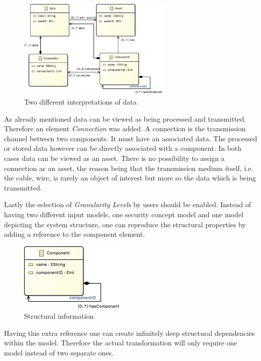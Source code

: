 \begin{figure}[H]
\centering
\includegraphics[width=0.65\textwidth]{pictures/two_data.png}
\caption{Two different interpretations of data}
\label{fig:data}
\end{figure} 

As already mentioned data can be viewed as being processed and transmitted. Therefore an element \textit{Connection} was added. A connection is the transmission channel between two components. It must have an associated data. The processed or stored data however can be directly associated with a component. In both cases data can be viewed as an asset. There is no possibility to assign a connection as an asset, the reason being that the transmission medium itself, i.e. the cable, wire, is rarely an object of interest but more so the data which is being transmitted.

Lastly the selection of \textit{Granularity Levels} by users should be enabled. Instead of having two different input models, one security concept model and one model depicting the system structure, one can reproduce the structural properties by adding a reference to the component element.      

\begin{figure}[H]
\centering
\includegraphics[width=0.45\textwidth]{pictures/component_structure.png}
\caption{Structural information}
\label{fig:data}
\end{figure} 

Having this extra reference one can create infinitely deep structural dependencies within the model. Therefore the actual transformation will only require one model instead of two separate ones.

